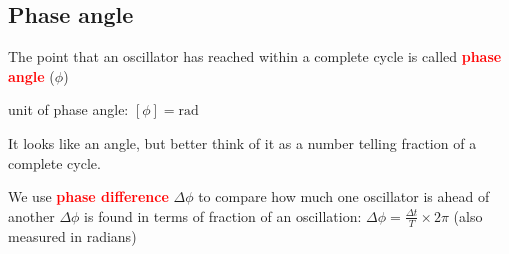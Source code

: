 \documentclass[a4paper,12pt]{book}
\newcounter{example}[chapter]
\renewcommand{\theexample}{\arabic{chapter}.\arabic{example}}
\newcommand{\example}[1]{%
	\refstepcounter{example}
	\noindent {\textcolor{cyan}{\textsf{\textbf{Example \theexample }}} \hspace*{1pt} #1 %
	} \vspace{5pt}}
\newcommand{\cmt}{}
\newcommand{\keypoint}[1]{\textbf{\textcolor{red}{#1}}}
\newcommand{\keypoint}[1]{\textbf{\textcolor{red}{#1}}}
\newcommand{\cmt}{}
\begin{document}
\subsection{Phase angle}
The point that an oscillator has reached within a complete cycle is called \keypoint{phase angle} ($\phi$)

\cmt unit of phase angle: $[\phi] = \text{rad}$

It looks like an angle, but better think of it as a number telling fraction of a complete cycle.

We use \keypoint{phase difference} $\Delta\phi$ to compare how much one oscillator is ahead of another $\Delta\phi$ is found in terms of fraction of an oscillation: $\Delta\phi = \frac{\Delta t}{T} \times 2\pi $ (also measured in radians)

%
%
\end{document}
